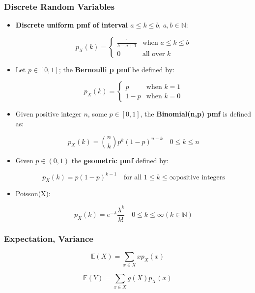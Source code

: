 \documentclass[10pt]{article}
\begin{document}

\subsubsection*{Discrete Random Variables}

\begin{multicols}{2}
\begin{itemize}
\item \textbf{Discrete uniform pmf of interval $a \leq k \leq b$},
  $a, b \in \mathbb{N}$:
  
  \[
    p_X(k) =
    \begin{cases}
      \frac{1}{b - a + 1} & \text{when } a \leq k \leq b \\
      0 & \text{all over } k
    \end{cases}
  \]

\item Let $p \in [0,1]$; the \textbf{Bernoulli p pmf} be defined by:
  
  \[
    p_X(k) =
    \begin{cases}
      p & \text{when } k = 1 \\
      1 - p & \text{when } k = 0
    \end{cases}
  \]

\columnbreak
    
\item Given positive integer $n$, some $p \in [0,1]$, the
  \textbf{Binomial(n,p) pmf} is defined as:

  \[
    p_X(k) = {n \choose k} p^k (1 - p)^{n-k} \quad 0 \leq k \leq n
  \]

\item Given $p \in (0, 1)$ the \textbf{geometric pmf} defined by:

  \[
    p_X(k) = p (1-p)^{k-1} \quad \text{for all } 1 \leq k \leq \infty
    \text{positive integers}
  \]

\item Poisson(X):

  \[
    p_X(k) = e^{-\lambda} \frac{\lambda^{k}}{k!} \quad 0 \leq k \leq
    \infty (k \in \mathbb{N})
  \]
\end{itemize}
\end{multicols}


\subsubsection*{Expectation, Variance}

\begin{multicols}{2}
\begin{equation}
  \tag{Expected Value Definition}
  \boxed{
    \mathbb{E}(X) = \sum\limits_{x \in X} x p_X(x)
  }
\end{equation}

\columnbreak

\begin{equation}
  \tag{Expected Value Rule}
  \boxed{
    \mathbb{E}(Y) = \sum\limits_{x \in X} g(X) p_X(x)
  }
\end{equation}
\end{multicols}
\end{document}
